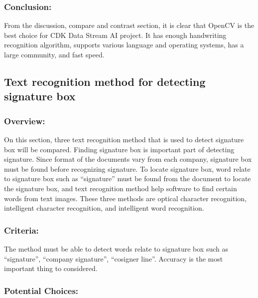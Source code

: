 \documentclass[article, onecolumn, draftclsnofoot,10pt, compsoc]{IEEEtran}
\begin{document}
\subsubsection{Conclusion:}
From the discussion, compare and contrast section, it is clear that OpenCV is the best choice for CDK Data Stream AI project. It has enough handwriting recognition algorithm, supports various language and operating systems, has a large community, and fast speed.

\subsection{Text recognition method for detecting signature box}
\subsubsection{Overview:}
On this section, three text recognition method that is used to detect signature box will be compared. Finding signature box is important part of detecting signature. Since format of the documents vary from each company, signature box must be found before recognizing signature. To locate signature box, word relate to signature box such as \enquote{signature} must be found from the document to locate the signature box, and text recognition method help software to find certain words from text images. These three methods are optical character recognition, intelligent character recognition, and intelligent word recognition.

\subsubsection{Criteria:}
The method must be able to detect words relate to signature box such as \enquote{signature}, \enquote{company signature}, \enquote{cosigner line}. Accuracy is the most important thing to considered.

\subsubsection{Potential Choices:}
\end{document}

